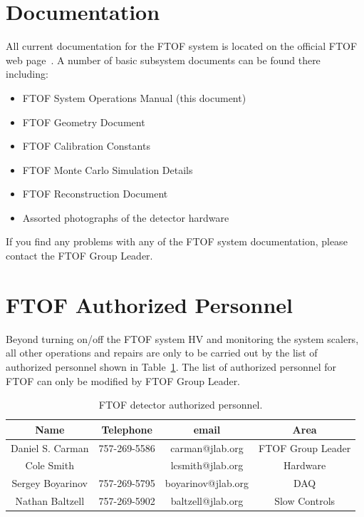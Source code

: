 \documentclass[12pt]{article}
\begin{document}
\clearpage

\vfil
\eject

\section{Documentation}

All current documentation for the FTOF system is located on the official FTOF web page~\cite{ftof-web}. 
A number of basic subsystem documents can be found there including:

\begin{itemize}
\item FTOF System Operations Manual (this document)
\item FTOF Geometry Document
\item FTOF Calibration Constants
\item FTOF Monte Carlo Simulation Details
\item FTOF Reconstruction Document
\item Assorted photographs of the detector hardware
\end{itemize}

If you find any problems with any of the FTOF system documentation, please contact the FTOF
Group Leader.

\section{FTOF Authorized Personnel}
\label{personnel}

Beyond turning on/off the FTOF system HV and monitoring the system scalers, all other operations and
repairs are only to be carried out by the list of authorized personnel shown in Table~\ref{expert-list}.
The list of authorized personnel for FTOF can only be modified by FTOF Group Leader.

\begin{table}[htbp]
\begin{center}
\begin{tabular} {|c|c|c|c|} \hline
Name             & Telephone    & email              & Area             \\ \hline \hline
Daniel S. Carman & 757-269-5586 & carman@jlab.org    & FTOF Group Leader\\ \hline
Cole Smith       &              & lcsmith@jlab.org   & Hardware         \\ \hline
Sergey Boyarinov & 757-269-5795 & boyarinov@jlab.org & DAQ              \\ \hline
Nathan Baltzell  & 757-269-5902 & baltzell@jlab.org  & Slow Controls    \\ \hline
\end{tabular}
\caption{FTOF detector authorized personnel.}
\label{expert-list}
\end{center}
\end{table}
\end{document}
